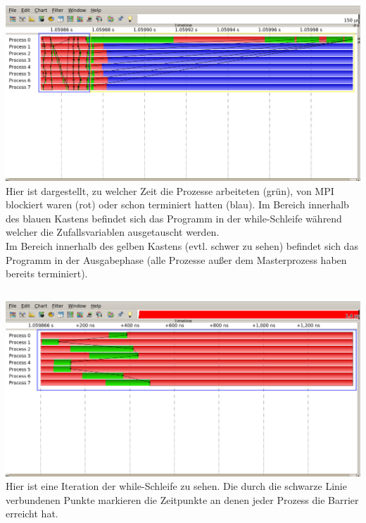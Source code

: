 \documentclass[fleqn]{article}
\begin{document}
\subsection{}%
\includegraphics[width=\textwidth]{vampir3}
Hier ist dargestellt, zu welcher Zeit die Prozesse arbeiteten (grün), von MPI blockiert waren (rot) oder schon terminiert hatten (blau). Im Bereich innerhalb des blauen Kastens befindet sich das Programm in der while-Schleife während welcher die Zufallsvariablen ausgetauscht werden.\\
Im Bereich innerhalb des gelben Kastens (evtl. schwer zu sehen) befindet sich das Programm in der Ausgabephase (alle Prozesse außer dem Masterprozess haben bereits terminiert).
\subsection{}%
\includegraphics[width=\textwidth]{vampir4}
Hier ist eine Iteration der while-Schleife zu sehen. Die durch die schwarze Linie verbundenen Punkte markieren die Zeitpunkte an denen jeder Prozess die Barrier erreicht hat.
\end{document}
